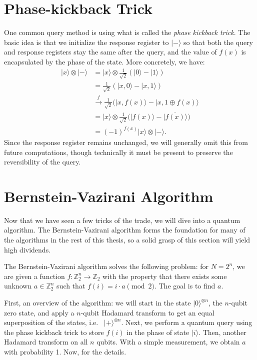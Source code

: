 \documentclass[12pt,twoside]{reedthesis}
\theoremstyle{definition}
\newlength{\arrow}
\newcommand{\Z}{\mathbb{Z}}
\newcommand{\ketz}{\ensuremath{\lvert 0\rangle}\xspace}
\newcommand{\keto}{\ensuremath{\lvert 1\rangle}\xspace}
\newcommand{\ket}[1]{\ensuremath{\lvert #1\rangle}\xspace}
\newcommand{\Hplus}{\ensuremath{\lvert + \rangle}\xspace}
\newcommand{\Hminus}{\ensuremath{\lvert- \rangle}\xspace}
\begin{document}
\section{Phase-kickback Trick}
 One common query method is using what is called the \textit{phase kickback trick}. The basic idea is that we initialize the response register to \Hminus so that both the query and response registers stay the same after the query, and the value of $f(x)$ is encapsulated by the phase of the state. More concretely, we have:
\begin{align*}
\ket{x} \otimes \Hminus 
& = \ket{x} \otimes \frac{1}{\sqrt{2}}(\ketz - \keto)\\
& = \frac{1}{\sqrt{2}}(\ket{x, 0} - \ket{x, 1}) \\
& \xrightarrow{f} \frac{1}{\sqrt{2}}(\ket{x, f(x)} - \ket{x, 1 \oplus f(x)} \\
& = \ket{x} \otimes \frac{1}{\sqrt{2}}\bigg(\ket{f(x)} - \ket{\overline{f(x)}}\bigg) \\
& = (-1)^{f(x)} \ket{x} \otimes \ket{ -}.
\end{align*}
Since the response register remains unchanged, we will generally omit this from future computations, though technically it must be present to preserve the reversibility of the query. 
\section{Bernstein-Vazirani Algorithm}

Now that we have seen a few tricks of the trade, we will dive into a quantum algorithm. The Bernstein-Vazirani algorithm forms the foundation for many of the algorithms in the rest of this thesis, so a solid grasp of this section will yield high dividends. 

The Bernstein-Vazirani algorithm solves the following problem: for $N = 2^n$, we are given a function $f: \Z_2^n \rightarrow \Z_2$ with the property that there exists some unknown $a \in \Z_2^n$ such that $f(i) = i \cdot a \pmod{2}$. The goal is to find $a$. 

First, an overview of the algorithm: we will start in the state $\ketz^{\otimes n}$, the $n$-qubit zero state, and apply a $n$-qubit Hadamard transform to get an equal superposition of the states, i.e.~ $\Hplus^{\otimes n}$. Next, we perform a quantum query using the phase kickback trick to store $f(i)$ in the phase of state $\ket{i}$. Then, another Hadamard transform on all $n$ qubits. With a simple measurement, we obtain $a$ with probability 1. Now, for the details.
\end{document}
